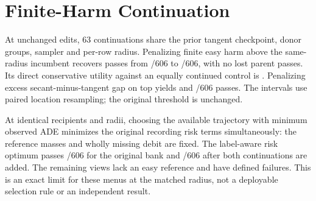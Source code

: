 \section{Finite-Harm Continuation}
At \FiniteGuardEdits{} unchanged edits, 63 continuations share
the prior tangent checkpoint, donor groups, sampler and per-row
radius. Penalizing finite easy harm above the same-radius
incumbent recovers passes from \FiniteGuardParent/606 to
\FiniteGuardFinite/606, with no lost parent passes. Its direct
conservative utility against an equally continued control is
\FiniteGuardFiniteUtility{}. Penalizing excess secant-minus-tangent
gap on top yields \FiniteGuardCurvatureUtility{} and
\FiniteGuardCurvature/606 passes. The intervals use paired
location resampling; the original threshold is unchanged.

At identical recipients and radii, choosing the available
trajectory with minimum observed ADE minimizes the original
recording risk terms simultaneously: the reference masses and
wholly missing debit are fixed. The label-aware risk optimum
passes \FiniteGuardOriginal/606 for the original bank and
\FiniteGuardExpanded/606 after both continuations are added.
The remaining \FiniteGuardAbsent{} views lack an easy reference
and \FiniteGuardDefinedFailed{} have defined failures. This is
an exact limit for these menus at the matched radius, not
a deployable selection rule or an independent result.

